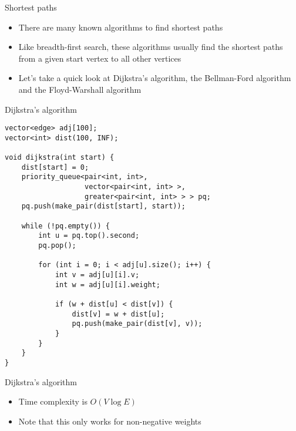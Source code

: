 \documentclass[12pt,t]{beamer}
\newcommand{\bi}{\begin{itemize}}
\newcommand{\ei}{\end{itemize}}
\begin{document}
\begin{frame}{Shortest paths}
    \vspace{40pt}
    \bi
        \item There are many known algorithms to find shortest paths
        \item Like breadth-first search, these algorithms usually find the shortest paths from a given start vertex to all other vertices
        \vspace{5pt}
        \item Let's take a quick look at Dijkstra's algorithm, the Bellman-Ford algorithm and the Floyd-Warshall algorithm
    \ei
\end{frame}


\begin{frame}[fragile]{Dijkstra's algorithm}
    \begin{verbatim}
vector<edge> adj[100];
vector<int> dist(100, INF);

void dijkstra(int start) {
    dist[start] = 0;
    priority_queue<pair<int, int>,
                   vector<pair<int, int> >,
                   greater<pair<int, int> > > pq;
    pq.push(make_pair(dist[start], start));

    while (!pq.empty()) {
        int u = pq.top().second;
        pq.pop();

        for (int i = 0; i < adj[u].size(); i++) {
            int v = adj[u][i].v;
            int w = adj[u][i].weight;

            if (w + dist[u] < dist[v]) {
                dist[v] = w + dist[u];
                pq.push(make_pair(dist[v], v));
            }
        }
    }
}
    \end{verbatim}
\end{frame}

\begin{frame}{Dijkstra's algorithm}
    \vspace{50pt}
    \bi
        \item Time complexity is $O(V \log E)$
        \vspace{10pt}
        \item Note that this only works for non-negative weights
    \ei
\end{frame}
\end{document}
